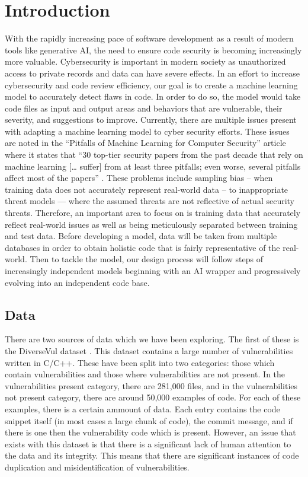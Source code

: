 \documentclass{article}
\begin{document}
\section{Introduction}
With the rapidly increasing pace of software development as a result of modern tools like generative AI, the need to ensure code security is becoming increasingly more valuable. Cybersecurity is important in modern society as unauthorized access to private records and data can have severe effects. In an effort to increase cybersecurity and code review efficiency, our goal is to create a machine learning model to accurately detect flaws in code. In order to do so, the model would take code files as input and output areas and behaviors that are vulnerable, their severity, and suggestions to improve. Currently, there are multiple issues present with adapting a machine learning model to cyber security efforts. These issues are noted in the “Pitfalls of Machine Learning for Computer Security” article where it states that “30 top-tier security papers from the past decade that rely on machine learning [… suffer] from at least three pitfalls; even worse, several pitfalls affect most of the papers” \cite{Arp2024}. These problems include sampling bias – when training data does not accurately represent real-world data – to inappropriate threat models — where the assumed threats are not reflective of actual security threats. Therefore, an important area to focus on is training data that accurately reflect real-world issues as well as being meticulously separated between training and test data. Before developing a model, data will be taken from multiple databases in order to obtain holistic code that is fairly representative of the real-world. Then to tackle the model, our design process will follow steps of increasingly independent models beginning with an AI wrapper and progressively evolving into an independent code base.


\subsection{Data}
There are two sources of data which we have been exploring. The first of these is the 
DiverseVul dataset \cite{chen2023diversevulnewvulnerablesource}. This dataset contains a large number of vulnerabilities written in C/C++.
These have been split into two categories: those which contain vulnerabilities and those
where vulnerabilities are not present. In the vulnerabilities present category, there are 
281,000 files, and in the vulnerabilities not present category, there are around 50,000
examples of code. For each of these examples, there is a certain ammount of data. Each entry
contains the code snippet itself (in most cases a large chunk of code), the commit message, and if there is one then the vulnerability code which is present. However, an issue that exists
with this dataset is that there is a significant lack of human attention to the data
and its integrity. This means that there are significant instances of code duplication and
misidentification of vulnerabilities.
\end{document}

